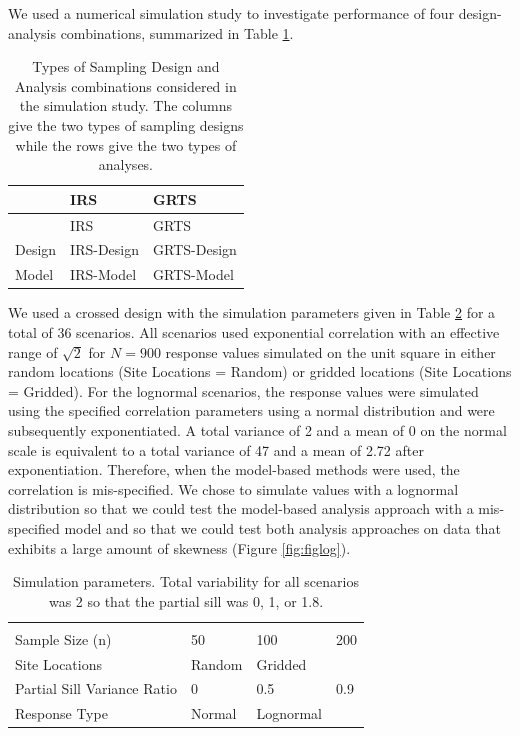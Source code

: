 \documentclass[]{elsarticle} %
\begin{document}
We used a numerical simulation study to investigate performance of four
design-analysis combinations, summarized in Table
\ref{tab:designanalysis}.

\begin{longtable}[]{@{}lll@{}}
\caption{\label{tab:designanalysis} Types of Sampling Design and
Analysis combinations considered in the simulation study. The columns
give the two types of sampling designs while the rows give the two types
of analyses.}\tabularnewline
\toprule
& IRS & GRTS \\
\midrule
\endfirsthead
\toprule
& IRS & GRTS \\
\midrule
\endhead
Design & IRS-Design & GRTS-Design \\
Model & IRS-Model & GRTS-Model \\
\bottomrule
\end{longtable}

We used a crossed design with the simulation parameters given in Table
\ref{tab:parmtab} for a total of 36 scenarios. All scenarios used
exponential correlation with an effective range of \(\sqrt{2}\) for
\(N = 900\) response values simulated on the unit square in either
random locations (Site Locations = Random) or gridded locations (Site
Locations = Gridded). For the lognormal scenarios, the response values
were simulated using the specified correlation parameters using a normal
distribution and were subsequently exponentiated. A total variance of 2
and a mean of 0 on the normal scale is equivalent to a total variance of
47 and a mean of 2.72 after exponentiation. Therefore, when the
model-based methods were used, the correlation is mis-specified. We
chose to simulate values with a lognormal distribution so that we could
test the model-based analysis approach with a mis-specified model and so
that we could test both analysis approaches on data that exhibits a
large amount of skewness (Figure \ref{fig:figlog}).

\begin{longtable}[]{@{}llll@{}}
\caption{\label{tab:parmtab} Simulation parameters. Total variability
for all scenarios was 2 so that the partial sill was 0, 1, or
1.8.}\tabularnewline
\toprule
& & & \\
\midrule
\endfirsthead
\toprule
& & & \\
\midrule
\endhead
Sample Size (n) & 50 & 100 & 200 \\
Site Locations & Random & Gridded & \\
Partial Sill Variance Ratio & 0 & 0.5 & 0.9 \\
Response Type & Normal & Lognormal & \\
\bottomrule
\end{longtable}
\end{document}

